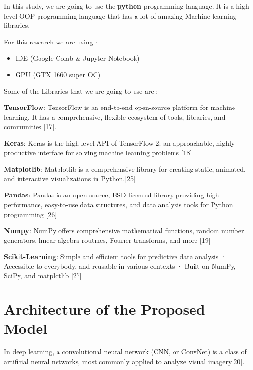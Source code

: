 In this study, we are going to use the \textbf{python} programming language. It is a high level OOP programming language that has a lot of amazing Machine learning libraries.

\vspace{5mm}
For this research we are using :

\begin{itemize}
    \item IDE (Google Colab & Jupyter Notebook)
    \item GPU (GTX 1660 super OC)
\end{itemize}

\newpage
Some of the Libraries that we are going to use are :

\vspace{5mm}
\textbf{TensorFlow}: TensorFlow is an end-to-end open-source platform for machine learning. It has a comprehensive, flexible ecosystem of tools, libraries, and communities [17].

\vspace{5mm}
\textbf{Keras}: Keras is the high-level API of TensorFlow 2: an approachable, highly-productive interface for solving machine learning problems [18]

\vspace{5mm}
\textbf{Matplotlib}: Matplotlib is a comprehensive library for creating static, animated, and interactive visualizations in Python.[25]

\vspace{5mm}
\textbf{Pandas}: Pandas is an open-source, BSD-licensed library providing high-performance, easy-to-use data structures, and data analysis tools for Python programming [26]

\vspace{5mm}
\textbf{Numpy}: NumPy offers comprehensive mathematical functions, random number generators, linear algebra routines, Fourier transforms, and more [19]

\vspace{5mm}
\textbf{Scikit-Learning}: Simple and efficient tools for predictive data analysis · Accessible to everybody, and reusable in various contexts · Built on NumPy, SciPy, and matplotlib [27]
 
\section{Architecture of the Proposed Model}
In deep learning, a convolutional neural network (CNN, or ConvNet) is a class of artificial neural networks, most commonly applied to analyze visual imagery[20].

